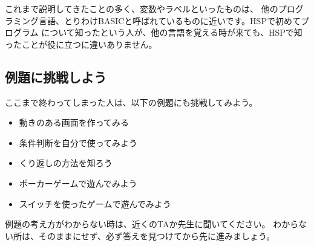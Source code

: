 \documentclass[text02.tex]{subfiles}
\begin{document}
これまで説明してきたことの多く、変数やラベルといったものは、
他のプログラミング言語、とりわけBASICと呼ばれているものに近いです。HSPで初めてプログラム
について知ったという人が、他の言語を覚える時が来ても、HSPで知ったことが役に立つに違いありません。

\subsection{例題に挑戦しよう}

ここまで終わってしまった人は、以下の例題にも挑戦してみよう。

\begin{itemize}
    \item 動きのある画面を作ってみる
    \item 条件判断を自分で使ってみよう
    \item くり返しの方法を知ろう
    \item ポーカーゲームで遊んでみよう
    \item スイッチを使ったゲームで遊んでみよう
\end{itemize}

例題の考え方がわからない時は、近くのTAか先生に聞いてください。
わからない所は、そのままにせず、必ず答えを見つけてから先に進みましょう。
\end{document}
